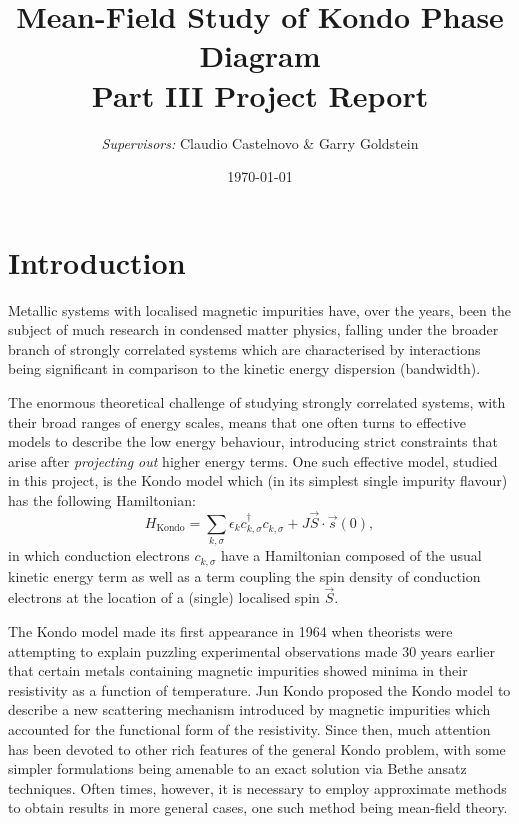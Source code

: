\documentclass[12pt]{article}
\begin{document}


\title{
  Mean-Field Study of Kondo Phase Diagram \\
  \large Part III Project Report
}
\author{\textit{Supervisors:} Claudio Castelnovo \& Garry Goldstein}
\date{\today}


\maketitle

\begin{abstract}
\end{abstract}

\section{Introduction}

Metallic systems with localised magnetic impurities have, over the years, been the subject of much research in condensed matter physics, falling under the broader branch of strongly correlated systems which are characterised by interactions being significant in comparison to the kinetic energy dispersion (bandwidth).

The enormous theoretical challenge of studying strongly correlated systems, with their broad ranges of energy scales, means that one often turns to effective models to describe the low energy behaviour, introducing strict constraints that arise after \textit{projecting out} higher energy terms. One such effective model, studied in this project, is the Kondo model which (in its simplest single impurity flavour) has the following Hamiltonian: \begin{equation} H_{\text{Kondo}}=\sum_{k,\sigma}\epsilon_{k} c_{k,\sigma}^{\dagger}c^{}_{k,\sigma}+J\vec{S}\cdot\vec{s}(0) , \label{eq:KondoHamiltonian}\end{equation} in which conduction electrons $ c_{k,\sigma} $ have a Hamiltonian composed of the usual kinetic energy term as well as a term coupling the spin density of conduction electrons at the location of a (single) localised spin $ \vec{S} $.

The Kondo model made its first appearance in 1964 when theorists were attempting to explain puzzling experimental observations made 30 years earlier that certain metals containing magnetic impurities showed minima in their resistivity as a function of temperature. Jun Kondo proposed the Kondo model to describe a new scattering mechanism introduced by magnetic impurities which accounted for the functional form of the resistivity. Since then, much attention has been devoted to other rich features of the general Kondo problem, with some simpler formulations being amenable to an exact solution via Bethe ansatz techniques. Often times, however, it is necessary to employ approximate methods to obtain results in more general cases, one such method being mean-field theory.
\end{document}
